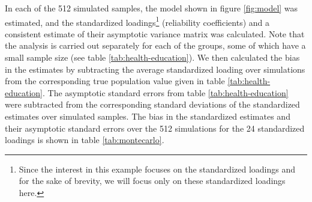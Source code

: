 \documentclass[a4paper,11pt]{article}
\newcommand{\0}{\boldsymbol{0}}
\begin{document}
In each of the 512 simulated samples, the model shown in figure \ref{fig:model} was estimated, and the
standardized loadings\footnote{Since the interest in this
example focuses on the standardized loadings and for the sake of brevity, we will focus only on
these standardized loadings here.} 
 (reliability coefficients) and a consistent estimate of their asymptotic variance matrix was
 calculated.
Note that the analysis is carried out separately for each of the groups, some of which have a small
sample size (see table \ref{tab:health-education}).
 We then calculated the bias in the estimates by subtracting the average standardized loading over simulations
 from the corresponding true population value given in table \ref{tab:health-education}. 
The asymptotic standard errors from table \ref{tab:health-education} were  subtracted from the 
corresponding standard deviations of the standardized estimates  over simulated samples.
 The bias in the standardized estimates and their asymptotic standard errors over the 512 simulations
 for the 24 standardized loadings is shown in table \ref{tab:montecarlo}.
\end{document}
